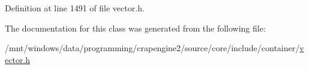 Definition at line 1491 of file vector.\+h.



The documentation for this class was generated from the following file\+:\begin{DoxyCompactItemize}
\item 
/mnt/windows/data/programming/crapengine2/source/core/include/container/\hyperlink{vector_8h}{vector.\+h}\end{DoxyCompactItemize}
